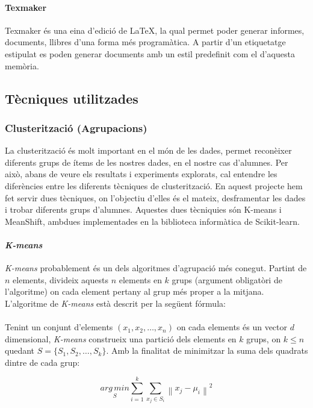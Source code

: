 \documentclass[12pt,a4paper,catalan]{article}
\begin{document}
\paragraph{Texmaker}
Texmaker \cite{texmaker} és una eina d'edició de \LaTeX, la qual permet poder generar informes, documents, llibres d'una forma més programàtica. A partir d'un etiquetatge estipulat es poden generar documents amb un estil predefinit com el d'aquesta memòria.

\newpage
\hypertarget{tecniquesutilitzades}{
	\subsection{Tècniques utilitzades}
}
\subsubsection{Clusterització (Agrupacions)}
La clusterització és molt important en el món de les dades, permet reconèixer diferents grups de ítems de les nostres dades, en el nostre cas d'alumnes. Per això, abans de veure els resultats i experiments explorats, cal entendre les diferències entre les diferents tècniques de clusterització. En aquest projecte hem fet servir dues tècniques, on l'objectiu d'elles és el mateix, desframentar les dades i trobar diferents grups d'alumnes. Aquestes dues tècniquies són K-means i MeanShift, ambdues implementades en la biblioteca informàtica de Scikit-learn.

\paragraph{\textit{K-means}}
\textit{K-means} \cite{k-means} probablement és un dels algoritmes d'agrupació més conegut. Partint de $n$ elements, divideix aquests $n$ elements en $k$ grups (argument obligatòri de l'algoritme) on cada element pertany al grup més proper a la mitjana. L'algoritme de \textit{K-means} està descrit per la següent fórmula:
\\
\\
Tenint un conjunt d'elements $(x_1, x_2, \ldots, x_n)$ on cada elements és un vector $d$ dimensional, \textit{K-means} construeix una partició dels elements en $k$ grups, on $k \leq n$ quedant $S = \{S_1, S_2, \ldots, S_k\}$. Amb la finalitat de minimitzar la suma dels quadrats dintre de cada grup:

$$ \underset{S} {arg\,min} \sum_{i=1}^{k} \sum_{x_j \in S_i} \left\| x_j - \mu_i \right\|^2 $$
\end{document}
